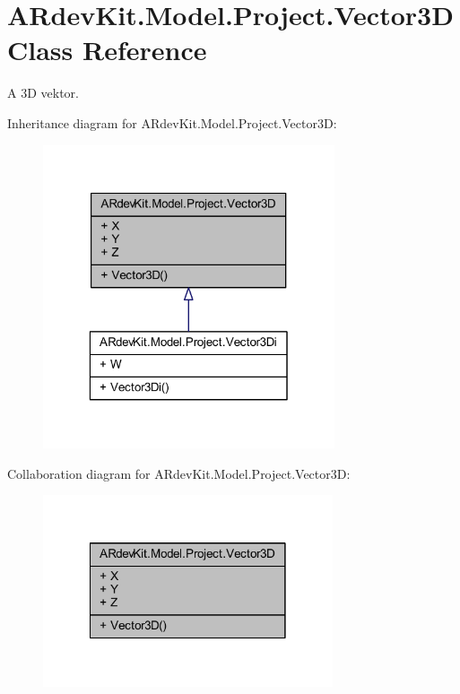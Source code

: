 \hypertarget{class_a_rdev_kit_1_1_model_1_1_project_1_1_vector3_d}{\section{A\-Rdev\-Kit.\-Model.\-Project.\-Vector3\-D Class Reference}
\label{class_a_rdev_kit_1_1_model_1_1_project_1_1_vector3_d}
}


A 3\-D vektor.  




Inheritance diagram for A\-Rdev\-Kit.\-Model.\-Project.\-Vector3\-D\-:
\nopagebreak
\begin{figure}[H]
\begin{center}
\leavevmode
\includegraphics[width=244pt]{class_a_rdev_kit_1_1_model_1_1_project_1_1_vector3_d__inherit__graph}
\end{center}
\end{figure}


Collaboration diagram for A\-Rdev\-Kit.\-Model.\-Project.\-Vector3\-D\-:
\nopagebreak
\begin{figure}[H]
\begin{center}
\leavevmode
\includegraphics[width=242pt]{class_a_rdev_kit_1_1_model_1_1_project_1_1_vector3_d__coll__graph}
\end{center}
\end{figure}
